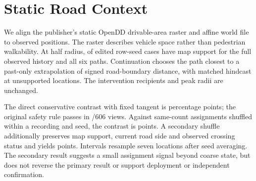 \section{Static Road Context}
We align the publisher's static OpenDD drivable-area raster and
affine world file to observed positions. The raster describes vehicle
space rather than pedestrian walkability. At half radius,
\RoadContextMapped{} of \RoadContextEdited{} edited row-seed cases
have map support for the full observed history and all six paths.
Continuation chooses the path closest to a past-only extrapolation
of signed road-boundary distance, with matched hindcast at unsupported
locations. The intervention recipients and peak radii are unchanged.

The direct conservative contrast with fixed tangent is
\RoadContextTangent{} percentage points; the original safety rule
passes in \RoadContextPass/606 views. Against same-count assignments
shuffled within a recording and seed, the contrast is
\RoadContextOverall{} points. A secondary shuffle additionally
preserves map support, current road side and observed crossing status
and yields \RoadContextState{} points. Intervals resample seven
locations after seed averaging. The secondary result suggests a small
assignment signal beyond coarse state, but does not reverse the
primary result or support deployment or independent confirmation.
